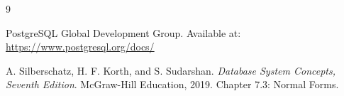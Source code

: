 \documentclass[12pt,a4paper]{article}
\begin{document}
\vspace{0.3cm}
\begin{thebibliography}{9}
	PostgreSQL Global Development Group.
	Available at: \url{https://www.postgresql.org/docs/}

	A. Silberschatz, H. F. Korth, and S. Sudarshan. \textit{Database System Concepts, Seventh Edition}. McGraw-Hill Education, 2019. Chapter 7.3: Normal Forms.

\end{thebibliography}
\end{document}
